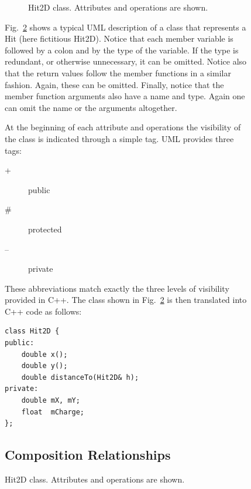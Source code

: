 \documentclass[twoside]{article}
\begin{document}
\begin{figure}[htb]
\begin{center}
\begin{figure}[htb]
\begin{center}
        \caption{Hit2D class. Attributes and operations are shown.}
        \label{fig:umlClass}
    \end{center}
\end{figure}
Fig.~\ref{fig:umlClass} shows a typical UML description of a class
that represents a Hit (here fictitious Hit2D).  Notice that each
member variable is followed by a colon and by the type of the
variable. If the type is redundant, or otherwise unnecessary, it can
be omitted. Notice also that the return values follow the member
functions in a similar fashion. Again, these can be omitted. Finally,
notice that the member function arguments also have a name and type.
Again one can omit the name or the arguments altogether.

At the beginning of each attribute and operations the visibility of
the class is indicated through a simple tag. UML provides three tags:
\begin{description}
\item[+] public
\item[\#] protected
\item[--] private
\end{description}
These abbreviations match exactly the three levels of visibility
provided in C++. The class shown in Fig.~\ref{fig:umlClass} is then
translated into C++ code as follows:

{\footnotesize
\begin{verbatim}
class Hit2D {
public:
    double x();
    double y();
    double distanceTo(Hit2D& h);
private:
    double mX, mY;
    float  mCharge;
};
\end{verbatim}
}%

\subsection{Composition Relationships}


\end{center}
\end{figure}
\end{document}
